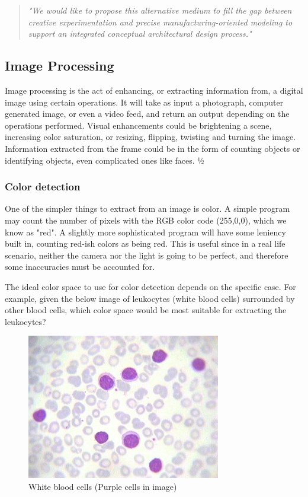 			\begin{quote}
				\textit{"We would like to propose this alternative medium to fill the gap between creative experimentation and precise manufacturing-oriented modeling to support an integrated conceptual architectural design process."}\cite{sketchingVsCAD}\label{proposalForMedium}\\
			\end{quote}

			\subsection{Image Processing}
			Image processing is the act of enhancing, or extracting information from, a digital image using certain operations. It will take as input a photograph, computer generated image, or even a video feed, and return an output depending on the operations performed. Visual enhancements could be brightening a scene, increasing color saturation, or resizing, flipping, twisting and turning the image. Information extracted from the frame could be  in the form of counting objects or identifying objects, even complicated ones like faces. 
		½
			\subsubsection{Color detection}
			One of the simpler things to extract from an image is color. A simple program may count the number of pixels with the RGB color code (255,0,0), which we know as "red". A slightly more sophisticated program will have some leniency built in, counting red-ish colors as being red. This is useful since in a real life scenario, neither the camera nor the light is going to be perfect, and therefore some inaccuracies must be accounted for. 
			
			The ideal color space to use for color detection depends on the specific case. 
			For example, given the below image of leukocytes (white blood cells) surrounded by other blood cells, which color space would be most suitable for extracting the leukocytes?
			\begin{figure}[H]
				\centering
				\includegraphics[width=0.2\linewidth]{figure/Analysis/leukocytes.jpg}
				\caption{White blood cells (Purple cells in image)}
				\label{fig:leukocytes}
			\end{figure}
			
